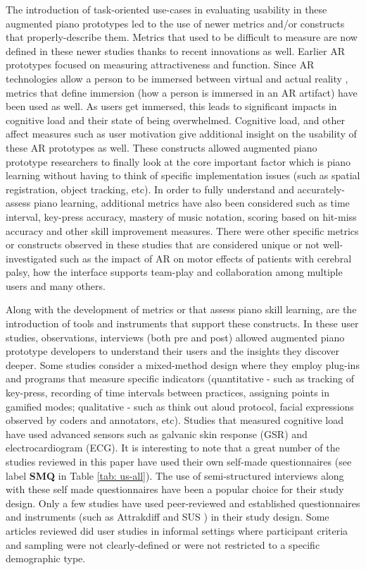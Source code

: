 \documentclass[sigchi, review]{acmart}
\begin{document}
The introduction of task-oriented use-cases in evaluating usability in these augmented piano prototypes led to the use of newer metrics and/or constructs that properly-describe them. Metrics that used to be difficult to measure are now defined in these newer studies thanks to recent innovations as well. Earlier AR prototypes focused on measuring attractiveness and function. Since AR technologies allow a person to be immersed between virtual and actual reality \cite{milgram1995augmented}, metrics that define immersion (how a person is immersed in an AR artifact) have been used as well. As users get immersed, this leads to significant impacts in cognitive load and their state of being overwhelmed. Cognitive load, and other affect measures such as user motivation give additional insight on the usability of these AR prototypes as well. These constructs allowed augmented piano prototype researchers to finally look at the core important factor which is piano learning without having to think of specific implementation issues (such as spatial registration, object tracking, etc). In order to fully understand and accurately-assess piano learning, additional metrics have also been considered such as time interval, key-press accuracy, mastery of music notation, scoring based on hit-miss accuracy and other skill improvement measures. There were other specific metrics or constructs observed in these studies that are considered unique or not well-investigated such as the impact of AR on motor effects of patients with cerebral palsy, how the interface supports team-play and collaboration among multiple users and many others. 

Along with the development of metrics or that assess piano skill learning, are the introduction of tools and instruments that support these constructs. In these user studies, observations, interviews (both pre and post) allowed augmented piano prototype developers to understand their users and the insights they discover deeper. Some studies consider a mixed-method design where they employ plug-ins and programs that measure specific indicators (quantitative - such as tracking of key-press, recording of time intervals between practices, assigning points in gamified modes; qualitative - such as think out aloud protocol, facial expressions observed by coders and annotators, etc). Studies that measured cognitive load have used advanced sensors such as galvanic skin response (GSR) and electrocardiogram (ECG). It is interesting to note that a great number of the studies reviewed in this paper have used their own self-made questionnaires (see label \textbf{SMQ} in Table \ref{tab: us-all}). The use of semi-structured interviews along with these self made questionnaires have been a popular choice for their study design. Only a few studies have used peer-reviewed and established questionnaires and instruments (such as Attrakdiff \cite{hassenzahl2003attrakdiff} and SUS \cite{lewis2009factor})  in their study design. Some articles reviewed did user studies in informal settings where participant criteria and sampling were not clearly-defined or were not restricted to a specific demographic type. 
\end{document}
